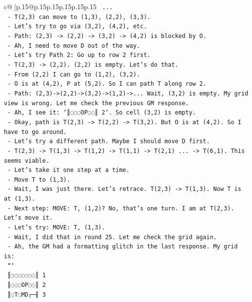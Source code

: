 \documentclass{article}
\begin{document}
{\begin{supertabular}{c@{$\;$}|p{.15\linewidth}@{}p{.15\linewidth}p{.15\linewidth}p{.15\linewidth}p{.15\linewidth}p{.15\linewidth}}
{{{\texttt{     ...} \\
\texttt{   {-} T(2,3) can move to (1,3), (2,2), (3,3).} \\
\texttt{   {-} Let's try to go via (3,2), (4,2), etc.} \\
\texttt{   {-} Path: (2,3) {-}> (2,2) {-}> (3,2) {-}> (4,2) is blocked by O.} \\
\texttt{   {-} Ah, I need to move D out of the way.} \\
\texttt{   {-} Let's try Path 2: Go up to row 2 first.} \\
\texttt{   {-} T(2,3) {-}> (2,2). (2,2) is empty. Let's do that.} \\
\texttt{   {-} From (2,2) I can go to (1,2), (3,2).} \\
\texttt{   {-} O is at (4,2), P at (5,2). So I can path T along row 2.} \\
\texttt{   {-} Path: (2,3){-}>(2,2){-}>(3,2){-}>(1,2){-}>... Wait, (3,2) is empty. My grid view is wrong. Let me check the previous GM response.} \\
\texttt{   {-} Ah, I see it: `║◌◌◌OP◌◌║ 2`. So cell (3,2) is empty.} \\
\texttt{   {-} Okay, path is T(2,3) {-}> T(2,2) {-}> T(3,2). But O is at (4,2). So I have to go around.} \\
\texttt{   {-} Let's try a different path. Maybe I should move D first.} \\
\texttt{   {-} T(2,3) {-}> T(1,3) {-}> T(1,2) {-}> T(1,1) {-}> T(2,1) ... {-}> T(6,1). This seems viable.} \\
\texttt{   {-} Let's take it one step at a time.} \\
\texttt{   {-} Move T to (1,3).} \\
\texttt{   {-} Wait, I was just there. Let's retrace. T(2,3) {-}> T(1,3). Now T is at (1,3).} \\
\texttt{   {-} Next step: MOVE: T, (1,2)? No, that's one turn. I am at T(2,3). Let's move it.} \\
\texttt{   {-} Let's try: MOVE: T, (1,3).} \\
\texttt{   {-} Wait, I did that in round 25. Let me check the grid again.} \\
\texttt{   {-} Ah, the GM had a formatting glitch in the last response. My grid is:} \\
\texttt{   ```} \\
\texttt{   ║◌◌◌◌◌◌◌║ 1} \\
\texttt{   ║◌◌◌OP◌◌║ 2} \\
\texttt{   ║◌T◌MD┌─╢ 3} \\
}}}
\end{supertabular}}
\end{document}

